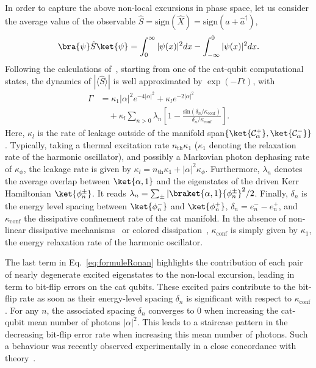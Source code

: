In order to capture the above non-local excursions in phase space, let us consider the average value of the observable $\hat S=\text{sign}(\hat X)=\text{sign}(\hat a+\hat a^\dag)$,
\begin{equation}
    \bra{\psi}\hat S \ket{\psi}=\int_0^\infty |\psi(x)|^2dx-\int_{-\infty}^0 |\psi(x)|^2 dx. 
\end{equation}
Following the calculations of~\cite{Gautier2022}, starting from one of the cat-qubit computational states, the dynamics of $|\langle \hat S\rangle|$ is well approximated by $\exp(-\Gamma t)$, with
\begin{equation}
    \begin{split}
        \Gamma &= \kappa_1|\alpha|^2e^{-4|\alpha|^2} + \kappa_le^{-2|\alpha|^2} \\
        & \quad +\kappa_l\sum_{n>0} \lambda_n \left[ 1- \frac{\text{sin}(\delta_n/\kappa_{\text{conf}}
        )}{\delta_n/\kappa_{\text{conf}}} \right].
        \label{eq:formuleRonan}
    \end{split}
\end{equation}
Here, $\kappa_l$ is the rate of leakage outside of the manifold span$\{\ket{\mathcal{C}_\alpha^+},\ket{\mathcal{C}_\alpha^-}\}$. Typically, taking a thermal excitation rate $n_{\text{th}}\kappa_1$ ($\kappa_1$ denoting the relaxation rate of the harmonic oscillator), and possibly a Markovian photon dephasing rate of $\kappa_\phi$, the leakage rate is given by $\kappa_l=n_{\text{th}}\kappa_1+|\alpha|^2\kappa_\phi$. Furthermore, $\lambda_n$ denotes the average overlap between $\ket{\alpha,1}$ and the eigenstates of the driven Kerr Hamiltonian $\ket{\phi_n^\pm}$. It reads $\lambda_n=\sum_{\pm}|{\braket{\alpha,1}{\phi_n^\pm}}^2/2$. Finally, $\delta_n$ is the energy level spacing between $\ket{\phi_n^-}$ and $\ket{\phi_n^+}$, $\delta_n = e^-_n - e^+_n$, and $\kappa_\text{conf}$ the dissipative confinement rate of the cat manifold. In the absence of non-linear dissipative mechanisms~\cite{Mirrahimi2014} or colored dissipation~\cite{Putterman2022}, $\kappa_\text{conf}$ is simply given by $\kappa_1$, the energy relaxation rate of the harmonic oscillator.

The last term in Eq.~\eqref{eq:formuleRonan} highlights the contribution of each pair of nearly degenerate excited eigenstates to the non-local excursion, leading in term to bit-flip errors on the cat qubits. These excited pairs contribute to the bit-flip rate as soon as their energy-level spacing $\delta_n$ is significant with respect to $\kappa_{\text{conf}}$. For any $n$, the associated spacing $\delta_n$ converges to 0 when increasing the cat-qubit mean number of photons $|\alpha|^2$. This leads to a staircase pattern in the decreasing bit-flip error rate when increasing this mean number of photons. Such a behaviour was recently observed experimentally in a close concordance with theory~\cite{Frattini-2022}.  


